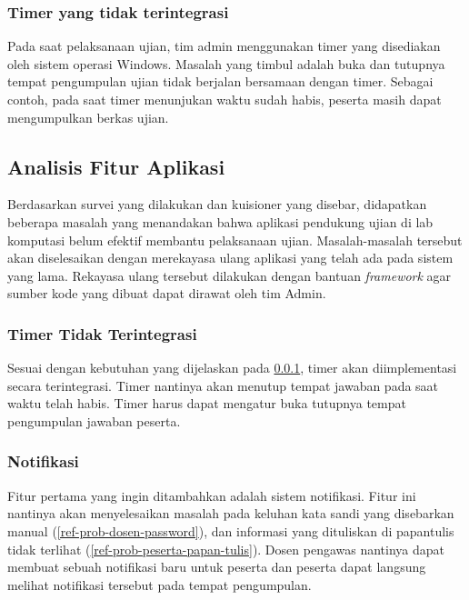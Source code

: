     \subsubsection{Timer yang tidak
    terintegrasi}\label{ref-prob-admin-timer-integrated} Pada saat pelaksanaan
    ujian, tim admin menggunakan timer yang disediakan oleh sistem operasi
    Windows. Masalah yang timbul adalah buka dan tutupnya tempat pengumpulan
    ujian tidak berjalan bersamaan dengan timer. Sebagai contoh, pada saat timer
    menunjukan waktu sudah habis, peserta masih dapat mengumpulkan berkas ujian.
    
    
\subsection{Analisis Fitur Aplikasi}
    Berdasarkan survei yang dilakukan dan kuisioner yang disebar, didapatkan
    beberapa masalah yang menandakan bahwa aplikasi pendukung ujian di lab
    komputasi belum efektif membantu pelaksanaan ujian. Masalah-masalah tersebut
    akan diselesaikan dengan merekayasa ulang aplikasi yang telah ada pada
    sistem yang lama. Rekayasa ulang tersebut dilakukan dengan bantuan
    \textit{framework} agar sumber kode yang dibuat dapat dirawat oleh tim
    Admin.
    
    \subsubsection{Timer Tidak Terintegrasi}
        Sesuai dengan kebutuhan yang dijelaskan pada
        \ref{ref-prob-admin-timer-integrated}, timer akan diimplementasi secara
        terintegrasi. Timer nantinya akan menutup tempat jawaban pada saat waktu
        telah habis. Timer harus dapat mengatur buka tutupnya tempat pengumpulan
        jawaban peserta.
    
    \subsubsection{Notifikasi}
        Fitur pertama yang ingin ditambahkan adalah sistem notifikasi. Fitur ini
        nantinya akan menyelesaikan masalah pada keluhan kata sandi yang
        disebarkan manual (\ref{ref-prob-dosen-password}), dan informasi yang
        dituliskan di papantulis tidak terlihat
        (\ref{ref-prob-peserta-papan-tulis}). Dosen pengawas nantinya dapat
        membuat sebuah notifikasi baru untuk peserta dan peserta dapat langsung
        melihat notifikasi tersebut pada tempat pengumpulan.


